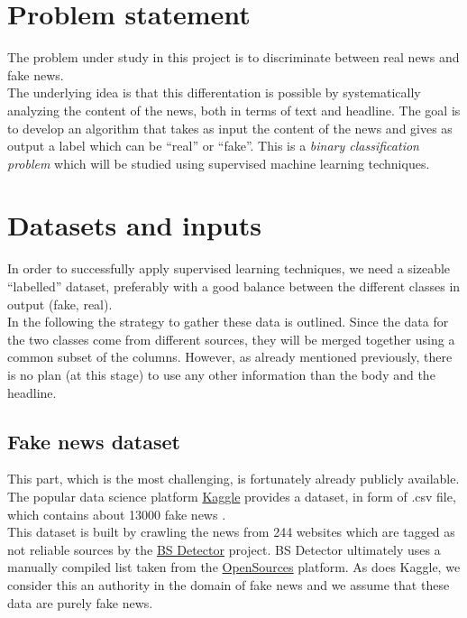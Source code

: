 \documentclass[a4paper,12pt]{article} %
\begin{document}
\section{Problem statement}
\label{sec:problem}
The problem under study in this project is to 
discriminate between real news and fake news. \\
The underlying idea is
that this differentation is possible by systematically analyzing the
content of the news, both in terms of text and headline. 
The goal is to develop an algorithm that takes as input the content of
the news and gives as output a label which can be ``real'' or
``fake''. This is a \textit{binary classification problem} which will
be studied using supervised machine learning techniques. 



\section{Datasets and inputs}
In order to successfully apply supervised learning techniques, we
need a sizeable ``labelled'' dataset, preferably with a good balance
between the different classes in output (fake, real). \\
In the following the strategy to gather these data is outlined. Since
the data for the two classes come from different sources, they will be
merged together using a common subset of the columns. However, as
already mentioned previously, there is no plan (at this stage) to use
any other information than the body and the headline. 

\subsection*{Fake news dataset}
This part, which is the most challenging, is fortunately already
publicly available. The popular data science platform 
\href{https://www.kaggle.com}{Kaggle} provides a dataset, in form of .csv
file, which contains about 13000 fake news \cite{KaggleDataset}. \\
This dataset is built by crawling the news from 244 websites which are
tagged as not reliable sources by the
\href{https://github.com/selfagency/bs-detector}{BS Detector}
project. BS Detector ultimately uses a manually compiled list taken
from the \href{http://www.opensources.co/}{OpenSources} platform. 
As does Kaggle, we consider this an authority in the domain of fake
news and we assume that these data are purely fake news. 
\end{document}
